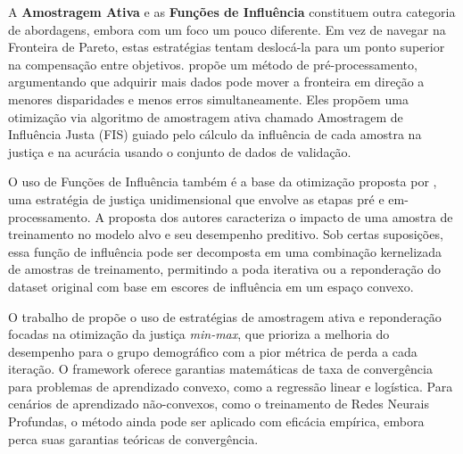 A \textbf{Amostragem Ativa} e as \textbf{Funções de Influência} constituem outra categoria de abordagens, embora com um foco um pouco diferente. Em vez de navegar na Fronteira de Pareto, estas estratégias tentam deslocá-la para um ponto superior na compensação entre objetivos.
\citet{pang2024fairness} propõe um método de pré-processamento, argumentando que adquirir mais dados pode mover a fronteira em direção a menores disparidades e menos erros simultaneamente. Eles propõem uma otimização via algoritmo de amostragem ativa chamado Amostragem de Influência Justa (FIS) guiado pelo cálculo da influência de cada amostra na justiça e na acurácia  usando o conjunto de dados de validação.

O uso de Funções de Influência também é a base da otimização proposta por \citet{wang2022understanding}, uma estratégia de justiça unidimensional que envolve as etapas pré e em-processamento. A proposta dos autores caracteriza o impacto de uma amostra de treinamento no modelo alvo e seu desempenho preditivo.
Sob certas suposições, essa função de influência pode ser decomposta em uma combinação kernelizada de amostras de treinamento,
permitindo a poda iterativa ou a reponderação do dataset original com base em escores de influência em um espaço convexo.

O trabalho de \citet{abernethy2020active} propõe o uso de estratégias de amostragem ativa e reponderação focadas na otimização da justiça \textit{min-max}, que prioriza a melhoria do desempenho para o grupo demográfico com a pior métrica de perda a cada iteração. O framework oferece garantias matemáticas de taxa de convergência para problemas de aprendizado convexo, como a regressão linear e logística. Para cenários de aprendizado não-convexos, como o treinamento de Redes Neurais Profundas, o método ainda pode ser aplicado com eficácia empírica, embora perca suas garantias teóricas de convergência.

